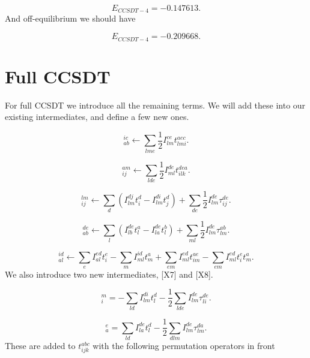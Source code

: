 \documentclass[a4paper,norsk,11pt,twoside]{report}
\begin{document}
\begin{equation}
E_{CCSDT-4} = -0.147613 .
\end{equation}
And off-equilibrium we should have

\begin{equation}
E_{CCSDT-4} = -0.209668 .
\end{equation}

\section{Full CCSDT}
For full CCSDT we introduce all the remaining terms. We will add these into our existing intermediates, and define a few new ones.

\begin{equation}
[X1]_{ab}^{ic} \leftarrow 
\sum_{lme}
\frac{1}{2}
I_{lm}^{ce} t_{lmi}^{aec} .
\end{equation}

\begin{equation}
[X2]_{ij}^{am} \leftarrow 
\sum_{lde}
\frac{1}{2}
I_{ml}^{de} t_{ilk}^{dea} .
\end{equation}

\begin{equation}
[X3]_{ij}^{lm} \leftarrow
\sum_d \left( I_{lm}^{dj} t_i^d
- I_{lm}^{di} t_j^d \right)
+ \sum_{de} \frac{1}{2} I_{lm}^{de} \tau_{ij}^{de} .
\end{equation}

\begin{equation}
[X4]_{ab}^{de} \leftarrow
\sum_l \left( 
I_{lb}^{de} t_l^a
- I_{la}^{de} t_l^b \right)
+ \sum_{ml} \frac{1}{2} I_{lm}^{de} \tau_{lm}^{ab} .
\end{equation}

\begin{equation}
[X6]_{al}^{id} \leftarrow 
\sum_{e} I_{al}^{ed} t_i^e
- \sum_m I_{ml}^{id} t_m^a
+ \sum_{em} I_{ml}^{ed} t_{im}^{ae}
- \sum_{em} I_{ml}^{ed} t_i^e t_m^a .
\end{equation}
We also introduce two new intermediates, [X7] and [X8].

\begin{equation}
[X7]_i^m = - \sum_{ld} I_{lm}^{di} t_l^d
- \frac{1}{2} \sum_{lde} I_{lm}^{de} \tau_{li}^{de} .
\end{equation}

\begin{equation}
[X8]_a^e = \sum_{ld} I_{la}^{de} t_l^d
- \frac{1}{2} \sum_{dlm} I_{lm}^{de} \tau_{lm}^{da} .
\end{equation}
These are added to $t_{ijk}^{abc}$ with the following permutation operators in front
\end{document}

